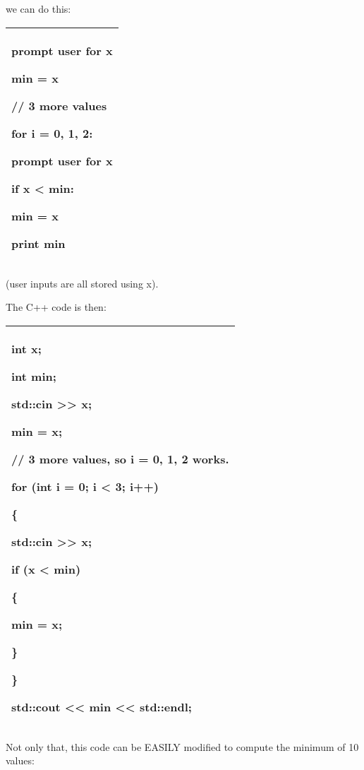 \documentclass[
]{article}
\begin{document}
we can do this:

\begin{longtable}[]{@{}l@{}}
\toprule
\endhead
\begin{minipage}[t]{0.97\columnwidth}\raggedright
prompt user for x

min = x

// 3 more values

for i = 0, 1, 2:

prompt user for x

if x \textless{} min:

min = x

print min\strut
\end{minipage}\tabularnewline
\bottomrule
\end{longtable}

(user inputs are all stored using x).

The C++ code is then:

\begin{longtable}[]{@{}l@{}}
\toprule
\endhead
\begin{minipage}[t]{0.97\columnwidth}\raggedright
int x;

int min;

std::cin \textgreater\textgreater{} x;

min = x;

// 3 more values, so i = 0, 1, 2 works.

for (int i = 0; i \textless{} 3; i++)

\{

std::cin \textgreater\textgreater{} x;

if (x \textless{} min)

\{

min = x;

\}

\}

std::cout \textless\textless{} min \textless\textless{} std::endl;\strut
\end{minipage}\tabularnewline
\bottomrule
\end{longtable}

Not only that, this code can be EASILY modified to compute the minimum
of 10 values:
\end{document}
